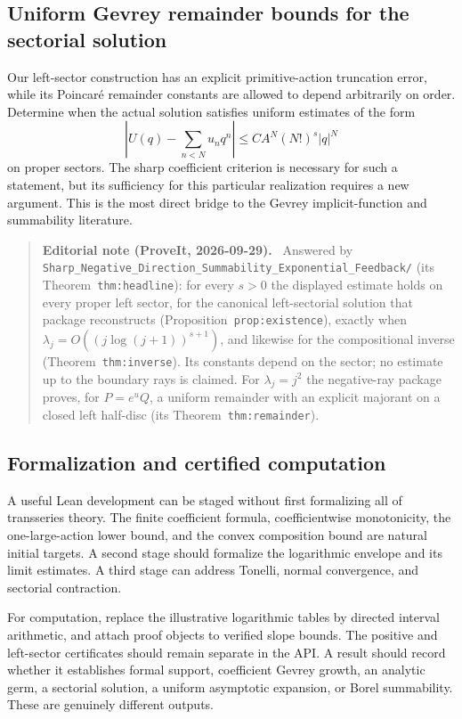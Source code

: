 \documentclass[11pt,a4paper]{article}
\numberwithin{equation}{section}
\theoremstyle{definition}
\theoremstyle{remark}
\newenvironment{ednote}{\par\smallskip\begin{quote}\small\raggedright\textbf{Editorial note (ProveIt, 2026-09-29).}\ }{\end{quote}\smallskip}
\begin{document}
\subsection{Uniform Gevrey remainder bounds for the sectorial solution}
Our left-sector construction has an explicit primitive-action truncation
error, while its Poincar\'e remainder constants are allowed to depend
arbitrarily on order.  Determine when the actual solution satisfies
uniform estimates of the form
\[
 \left|U(q)-\sum_{n<N}u_nq^n\right|
 \le CA^N(N!)^s|q|^N
\]
on proper sectors.  The sharp coefficient criterion is necessary for
such a statement, but its sufficiency for this particular realization
requires a new argument.  This is the most direct bridge to the Gevrey
implicit-function and summability literature.
\begin{ednote}
Answered by
\nolinkurl{Sharp_Negative_Direction_Summability_Exponential_Feedback/}
(its Theorem~\texttt{thm:headline}): for every $s>0$ the displayed estimate holds on
every proper left sector, for the canonical left-sectorial solution that
package reconstructs (Proposition~\texttt{prop:existence}), exactly when
$\lambda_j=O((j\log(j+1))^{s+1})$, and likewise for the compositional
inverse (Theorem~\texttt{thm:inverse}). Its constants depend on the sector; no
estimate up to the boundary rays is claimed. For $\lambda_j=j^2$ the
negative-ray package proves, for $P=e^uQ$, a uniform remainder with an
explicit majorant on a closed left half-disc (its Theorem~\texttt{thm:remainder}).
\end{ednote}

\subsection{Formalization and certified computation}
A useful Lean development can be staged without first formalizing all of
transseries theory.  The finite coefficient formula, coefficientwise
monotonicity, the one-large-action lower bound, and the convex composition
bound are natural initial targets.  A second stage should formalize the
logarithmic envelope and its limit estimates.  A third stage can address
Tonelli, normal convergence, and sectorial contraction.

For computation, replace the illustrative logarithmic tables by directed
interval arithmetic, and attach proof objects to verified slope bounds.
The positive and left-sector certificates should remain separate in the
API.  A result should record whether it establishes formal support,
coefficient Gevrey growth, an analytic germ, a sectorial solution,
a uniform asymptotic expansion, or Borel summability.  These are genuinely
different outputs.
\end{document}

